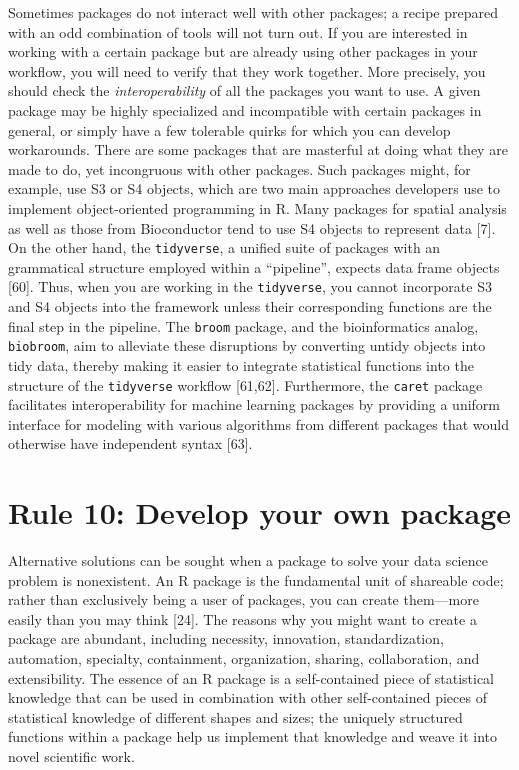 \documentclass[10pt,letterpaper]{article}
\begin{document}
Sometimes packages do not interact well with other packages; a recipe
prepared with an odd combination of tools will not turn out. If you are
interested in working with a certain package but are already using other
packages in your workflow, you will need to verify that they work
together. More precisely, you should check the \emph{interoperability}
of all the packages you want to use. A given package may be highly
specialized and incompatible with certain packages in general, or simply
have a few tolerable quirks for which you can develop workarounds. There
are some packages that are masterful at doing what they are made to do,
yet incongruous with other packages. Such packages might, for example,
use S3 or S4 objects, which are two main approaches developers use to
implement object-oriented programming in R. Many packages for spatial
analysis as well as those from Bioconductor tend to use S4 objects to
represent data {[}7{]}. On the other hand, the \texttt{tidyverse}, a
unified suite of packages with an grammatical structure employed within
a ``pipeline'', expects data frame objects {[}60{]}. Thus, when you are
working in the \texttt{tidyverse}, you cannot incorporate S3 and S4
objects into the framework unless their corresponding functions are the
final step in the pipeline. The \texttt{broom} package, and the
bioinformatics analog, \texttt{biobroom}, aim to alleviate these
disruptions by converting untidy objects into tidy data, thereby making
it easier to integrate statistical functions into the structure of the
\texttt{tidyverse} workflow {[}61,62{]}. Furthermore, the \texttt{caret}
package facilitates interoperability for machine learning packages by
providing a uniform interface for modeling with various algorithms from
different packages that would otherwise have independent syntax
{[}63{]}.

\hypertarget{rule-10-develop-your-own-package}{%
\section{Rule 10: Develop your own
package}\label{rule-10-develop-your-own-package}}

Alternative solutions can be sought when a package to solve your data
science problem is nonexistent. An R package is the fundamental unit of
shareable code; rather than exclusively being a user of packages, you
can create them---more easily than you may think {[}24{]}. The reasons
why you might want to create a package are abundant, including
necessity, innovation, standardization, automation, specialty,
containment, organization, sharing, collaboration, and extensibility.
The essence of an R package is a self-contained piece of statistical
knowledge that can be used in combination with other self-contained
pieces of statistical knowledge of different shapes and sizes; the
uniquely structured functions within a package help us implement that
knowledge and weave it into novel scientific work.
\end{document}
